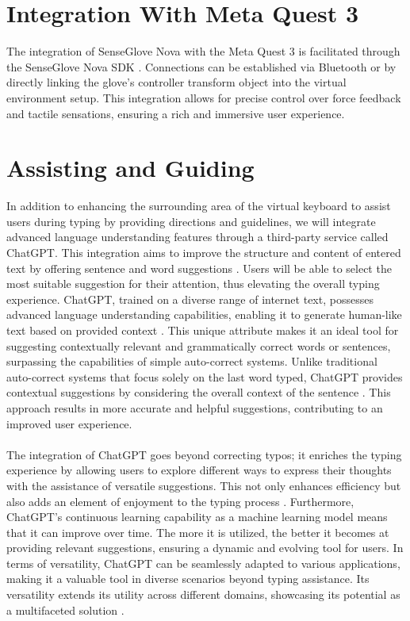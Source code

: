 \section{Integration With Meta Quest 3}
\label{subsec:IntegrationWithMetaQuest3}

The integration of SenseGlove Nova with the Meta Quest 3 is facilitated through the SenseGlove Nova SDK \cite{senseglove_sdk} . Connections can be established via Bluetooth or by directly linking the glove's controller transform object into the virtual environment setup. This integration allows for precise control over force feedback and tactile sensations, ensuring a rich and immersive user experience.





\section{Assisting and Guiding}
\label{sec:AssistingGuiding}

In addition to enhancing the surrounding area of the virtual keyboard to assist users during typing by providing directions and guidelines, we will integrate advanced language understanding features through a third-party service called ChatGPT. This integration aims to improve the structure and content of entered text by offering sentence and word suggestions \cite{openai, ioshacker}. Users will be able to select the most suitable suggestion for their attention, thus elevating the overall typing experience. ChatGPT, trained on a diverse range of internet text, possesses advanced language understanding capabilities, enabling it to generate human-like text based on provided context \cite{openai}. This unique attribute makes it an ideal tool for suggesting contextually relevant and grammatically correct words or sentences, surpassing the capabilities of simple auto-correct systems. Unlike traditional auto-correct systems that focus solely on the last word typed, ChatGPT provides contextual suggestions by considering the overall context of the sentence \cite{yellow, online-tech}. This approach results in more accurate and helpful suggestions, contributing to an improved user experience. \\ \\
The integration of ChatGPT goes beyond correcting typos; it enriches the typing experience by allowing users to explore different ways to express their thoughts with the assistance of versatile suggestions. This not only enhances efficiency but also adds an element of enjoyment to the typing process \cite{ioshacker}. Furthermore, ChatGPT's continuous learning capability as a machine learning model means that it can improve over time. The more it is utilized, the better it becomes at providing relevant suggestions, ensuring a dynamic and evolving tool for users. In terms of versatility, ChatGPT can be seamlessly adapted to various applications, making it a valuable tool in diverse scenarios beyond typing assistance. Its versatility extends its utility across different domains, showcasing its potential as a multifaceted solution \cite{openai}.



